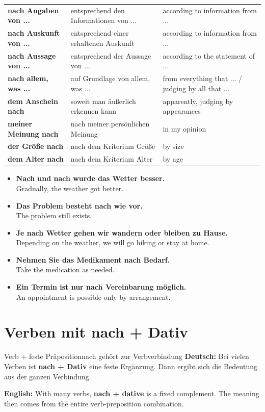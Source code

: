 \documentclass[a4paper,11pt]{article}
\newcommand{\GermanText}[1]{\textbf{Deutsch: }#1\par}
\newcommand{\EnglishText}[1]{{\small\color{SoftGray}\textbf{English: }#1\par}}
\newcommand{\ExampleItem}[2]{\item \textbf{#1}\\{\small\color{SoftGray}#2}}
\begin{document}
\begin{longtable}{>{\bfseries}p{4.2cm}|p{5.0cm}|p{5.0cm}}
            nach Angaben von ... & entsprechend den Informationen von ... & according to information from ... \\
            nach Auskunft von ... & entsprechend einer erhaltenen Auskunft & according to information from ... \\
            nach Aussage von ... & entsprechend der Aussage von ... & according to the statement of ... \\
            nach allem, was ... & auf Grundlage von allem, was ... & from everything that ... / judging by all that ... \\
            dem Anschein nach & soweit man äußerlich erkennen kann & apparently, judging by appearances \\
            meiner Meinung nach & nach meiner persönlichen Meinung & in my opinion \\
            der Größe nach & nach dem Kriterium Größe & by size \\
            dem Alter nach & nach dem Kriterium Alter & by age \\
        \end{longtable}

        \begin{exbox}
            \begin{itemize}
                \ExampleItem{Nach und nach wurde das Wetter besser.}{Gradually, the weather got better.}
                \ExampleItem{Das Problem besteht nach wie vor.}{The problem still exists.}
                \ExampleItem{Je nach Wetter gehen wir wandern oder bleiben zu Hause.}{Depending on the weather, we will go hiking or stay at home.}
                \ExampleItem{Nehmen Sie das Medikament nach Bedarf.}{Take the medication as needed.}
                \ExampleItem{Ein Termin ist nur nach Vereinbarung möglich.}{An appointment is possible only by arrangement.}
            \end{itemize}
        \end{exbox}


    \section{Verben mit nach + Dativ}

        \begin{grammarentry}{Verb + feste Präposition}{nach gehört zur Verbverbindung}
            \GermanText{Bei vielen Verben ist \textbf{nach + Dativ} eine feste Ergänzung. Dann ergibt sich die Bedeutung aus der ganzen Verbindung.}
            \EnglishText{With many verbs, \textbf{nach + dative} is a fixed complement. The meaning then comes from the entire verb-preposition combination.}
        \end{grammarentry}
\end{document}
